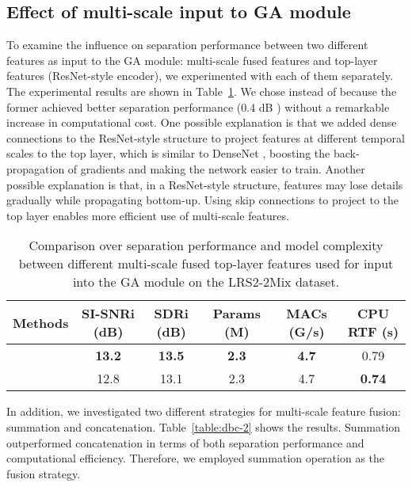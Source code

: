 \documentclass{article} \usepackage{iclr2023_conference,times}
\begin{document}
\subsection{Effect of multi-scale input to GA module}
\label{sec:a-ga}
To examine the influence on separation performance between two different features as input to the GA module: multi-scale fused features  and top-layer features  (ResNet-style encoder), we experimented with each of them separately. The experimental results are shown in Table~\ref{table:dbc-1}. We chose  instead of  because the former achieved better separation performance (0.4 dB ) without a remarkable increase in computational cost. One possible explanation is that we added dense connections to the ResNet-style structure to project features at different temporal scales to the top layer, which is similar to DenseNet \cite{huang2017densely}, boosting the back-propagation of gradients and making the network easier to train. Another possible explanation is that, in a ResNet-style structure, features may lose details gradually while propagating bottom-up. Using skip connections to project to the top layer enables more efficient use of multi-scale features.


\begin{table}[ht]
\caption{Comparison over separation performance and model complexity between different multi-scale fused top-layer features used for input into the GA module on the LRS2-2Mix dataset.}
\label{table:dbc-1}
\begin{center}
\begin{tabular}{cccccc}
\toprule
Methods & SI-SNRi (dB) & SDRi (dB) & Params (M) & MACs (G/s) & CPU RTF (s) \\
\midrule
 & \bf 13.2         & \bf 13.5      & \bf 2.3        & \bf 4.7        & 0.79        \\
        & 12.8         & 13.1      & 2.3        & 4.7        & \bf 0.74       \\
\bottomrule
\end{tabular}
\end{center}
\end{table}

In addition, we investigated two different strategies for multi-scale feature fusion: summation and concatenation. Table~\ref{table:dbc-2} shows the results. Summation outperformed concatenation in terms of both separation performance and computational efficiency. Therefore, we employed summation operation as the fusion strategy.
\end{document}
